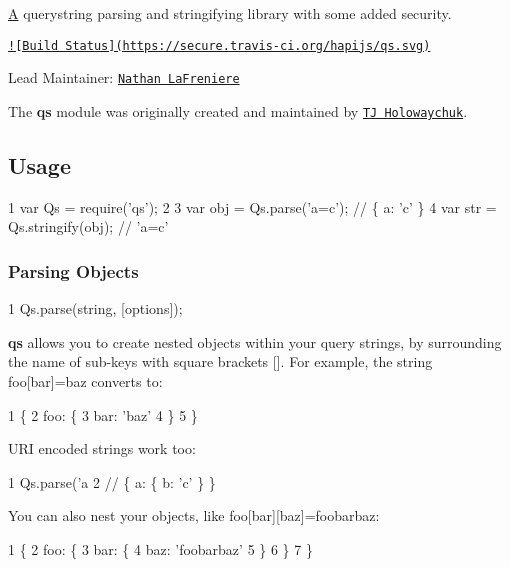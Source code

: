 \hyperlink{class_a}{A} querystring parsing and stringifying library with some added security.

\href{http://travis-ci.org/hapijs/qs}{\tt !\mbox{[}Build Status\mbox{]}(https\+://secure.\+travis-\/ci.\+org/hapijs/qs.\+svg)}

Lead Maintainer\+: \href{https://github.com/nlf}{\tt Nathan La\+Freniere}

The {\bfseries qs} module was originally created and maintained by \href{https://github.com/visionmedia/node-querystring}{\tt T\+J Holowaychuk}.

\subsection*{Usage}


\begin{DoxyCode}
1 var Qs = require('qs');
2 
3 var obj = Qs.parse('a=c');    // \{ a: 'c' \}
4 var str = Qs.stringify(obj);  // 'a=c'
\end{DoxyCode}


\subsubsection*{Parsing Objects}


\begin{DoxyCode}
1 Qs.parse(string, [options]);
\end{DoxyCode}


{\bfseries qs} allows you to create nested objects within your query strings, by surrounding the name of sub-\/keys with square brackets {\ttfamily \mbox{[}\mbox{]}}. For example, the string {\ttfamily \textquotesingle{}foo\mbox{[}bar\mbox{]}=baz\textquotesingle{}} converts to\+:


\begin{DoxyCode}
1 \{
2   foo: \{
3     bar: 'baz'
4   \}
5 \}
\end{DoxyCode}


U\+R\+I encoded strings work too\+:


\begin{DoxyCode}
1 Qs.parse('a%
2 // \{ a: \{ b: 'c' \} \}
\end{DoxyCode}


You can also nest your objects, like {\ttfamily \textquotesingle{}foo\mbox{[}bar\mbox{]}\mbox{[}baz\mbox{]}=foobarbaz\textquotesingle{}}\+:


\begin{DoxyCode}
1 \{
2   foo: \{
3     bar: \{
4       baz: 'foobarbaz'
5     \}
6   \}
7 \}
\end{DoxyCode}


